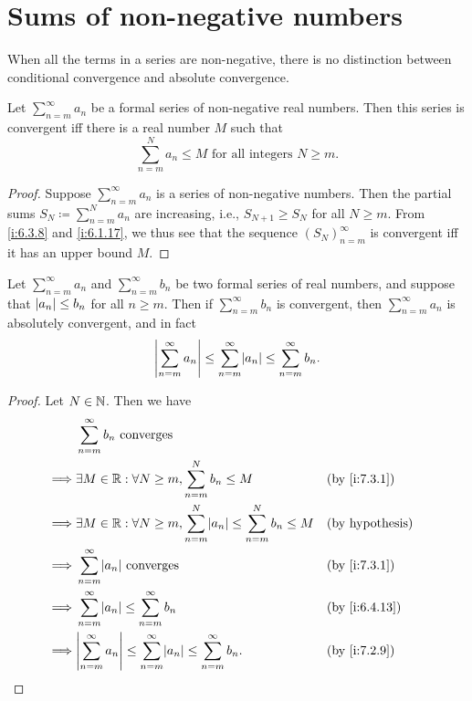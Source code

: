 \section{Sums of non-negative numbers}\label{i:sec:7.3}

\begin{note}
  When all the terms in a series are non-negative, there is no distinction between conditional convergence and absolute convergence.
\end{note}

\begin{prop}\label{i:7.3.1}
  Let \(\sum_{n = m}^\infty a_n\) be a formal series of non-negative real numbers.
  Then this series is convergent iff there is a real number \(M\) such that
  \[
    \sum_{n = m}^N a_n \leq M \text{ for all integers } N \geq m.
  \]
\end{prop}

\begin{proof}
  Suppose \(\sum_{n = m}^\infty a_n\) is a series of non-negative numbers.
  Then the partial sums \(S_N \coloneqq \sum_{n = m}^N a_n\) are increasing, i.e., \(S_{N + 1} \geq S_N\) for all \(N \geq m\).
  From \cref{i:6.3.8} and \cref{i:6.1.17}, we thus see that the sequence \((S_N)_{n = m}^\infty\) is convergent iff it has an upper bound \(M\).
\end{proof}

\begin{cor}\label{i:7.3.2}
  Let \(\sum_{n = m}^\infty a_n\) and \(\sum_{n = m}^\infty b_n\) be two formal series of real numbers, and suppose that \(\left\lvert a_n\right\rvert \leq b_n\) for all \(n \geq m\).
  Then if \(\sum_{n = m}^\infty b_n\) is convergent, then \(\sum_{n = m}^\infty a_n\) is absolutely convergent, and in fact
  \[
    \abs{\sum_{n = m}^\infty a_n} \leq \sum_{n = m}^\infty \abs{a_n} \leq \sum_{n = m}^\infty b_n.
  \]
\end{cor}

\begin{proof}
  Let \(N \in \mathbb{N}\).
  Then we have
  \begin{align*}
             & \sum_{n = m}^\infty b_n \text{ converges}                                                                                  \\
    \implies & \exists M \in \R : \forall N \geq m, \sum_{n = m}^N b_n \leq M                                 &  & \by{i:7.3.1}           \\
    \implies & \exists M \in \R : \forall N \geq m, \sum_{n = m}^N \abs{a_n} \leq \sum_{n = m}^N b_n \leq M   &  & \text{(by hypothesis)} \\
    \implies & \sum_{n = m}^\infty \abs{a_n} \text{ converges}                                                &  & \by{i:7.3.1}           \\
    \implies & \sum_{n = m}^\infty \abs{a_n} \leq \sum_{n = m}^\infty b_n                                     &  & \by{i:6.4.13}          \\
    \implies & \abs{\sum_{n = m}^\infty a_n} \leq \sum_{n = m}^\infty \abs{a_n} \leq \sum_{n = m}^\infty b_n. &  & \by{i:7.2.9}
  \end{align*}
\end{proof}

